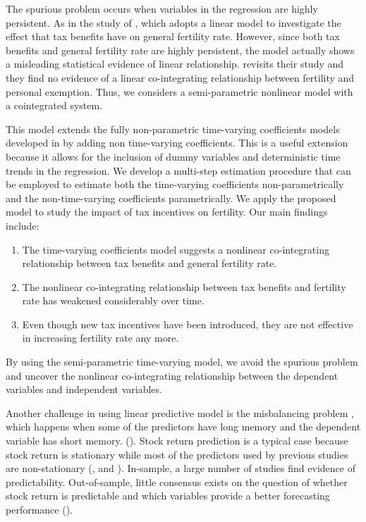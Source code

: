 \documentclass[a4paper,12pt,times,numbered,print,index]{report}
\numberwithin{equation}{section}
\begin{document}
The spurious problem occurs when variables in the regression are highly persistent. As in the study of \cite{whittington1990fertility}, which adopts a linear model to investigate the effect that tax benefits have on general fertility rate. However, since both tax benefits and general fertility rate are highly persistent, the model actually shows a misleading statistical evidence of linear relationship.\cite{crump2011fertility} revisits their study and they find no evidence of a linear co-integrating relationship between fertility and personal exemption. Thus, we considers a
semi-parametric nonlinear model with a cointegrated system. 

This model extends the fully non-parametric time-varying coefficients models developed in \cite{li2016estimation}  by adding non time-varying coefficients. This is a useful extension because it allows for the inclusion of dummy variables and deterministic time trends in the regression. We develop a multi-step estimation procedure that can be employed to estimate both the time-varying coefficients non-parametrically and the non-time-varying coefficients parametrically. We apply the proposed model to
study the impact of tax incentives on fertility. Our main findings include:

\begin{enumerate}
	\item The time-varying coefficients model suggests a nonlinear co-integrating relationship between tax benefits and general fertility rate.
	
	\item The nonlinear co-integrating relationship between tax benefits and fertility rate has weakened considerably over time.
	
	\item Even though new tax incentives have been introduced, they are not effective in increasing fertility rate any more.
\end{enumerate}

By using the semi-parametric time-varying model, we avoid the spurious problem and uncover the nonlinear co-integrating relationship between the dependent variables and independent variables. 

Another challenge in using linear predictive model is the misbalancing problem , which happens when some of the predictors have long memory and the dependent variable has short memory. (\cite{phillips2015halbert}). Stock return prediction is a typical case because stock return is stationary while most of the predictors used by previous studies are non-stationary (\cite{campbell1988dividend}, \cite{fama1990stock} and \cite{pesaran1995predictability}). In-sample, 
a large number of studies find evidence of predictability. Out-of-sample, little consensus exists on the question of whether stock return is predictable and which variables provide a better forecasting performance (\cite{welch2008comprehensive}).
\end{document}

